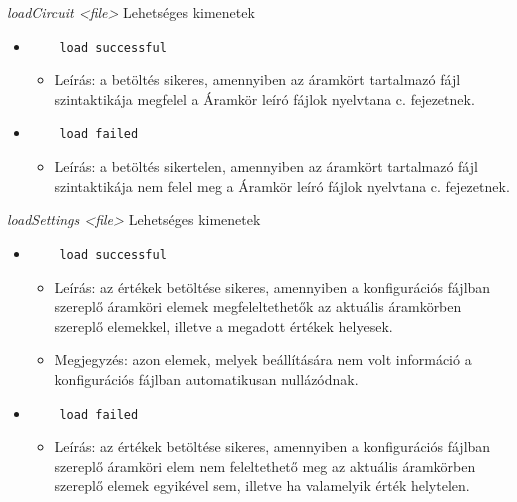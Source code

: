 \textit{loadCircuit <file>}\newline
Lehetséges kimenetek
\begin{itemize}
	\item
	\begin{verbatim}
	load successful
	\end{verbatim}
	\begin{itemize}
		\item Leírás: a betöltés sikeres, amennyiben az áramkört tartalmazó fájl szintaktikája megfelel a Áramkör leíró fájlok nyelvtana c. fejezetnek.
	\end{itemize}
	\item 
	\begin{verbatim}
	load failed
	\end{verbatim}
	\begin{itemize}
		\item Leírás: a betöltés sikertelen, amennyiben az áramkört tartalmazó fájl szintaktikája nem felel meg a Áramkör leíró fájlok nyelvtana c. fejezetnek.
	\end{itemize}
\end{itemize}

\textit{loadSettings <file>}\newline
Lehetséges kimenetek
\begin{itemize}
	\item
	\begin{verbatim}
	load successful
	\end{verbatim}
	\begin{itemize}
		\item Leírás: az értékek betöltése sikeres, amennyiben a konfigurációs fájlban szereplő áramköri elemek megfeleltethetők az aktuális áramkörben szereplő elemekkel, illetve a megadott értékek helyesek.
		\item Megjegyzés: azon elemek, melyek beállítására nem volt információ a konfigurációs fájlban automatikusan nullázódnak.
	\end{itemize}
	\item
	\begin{verbatim}
	load failed
	\end{verbatim}
	\begin{itemize}
		\item Leírás: az értékek betöltése sikeres, amennyiben a konfigurációs fájlban szereplő áramköri elem nem feleltethető meg az aktuális áramkörben szereplő elemek egyikével sem, illetve ha valamelyik érték helytelen.
	\end{itemize}
\end{itemize}

